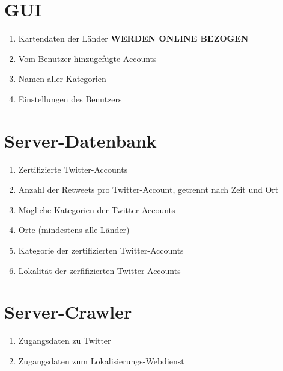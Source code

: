 \section{GUI}
\begin{enumerate}[align=left, label={\textbf{\textbackslash PD10\arabic*0\textbackslash}} ]
	\item Kartendaten der Länder \textbf{WERDEN ONLINE BEZOGEN}
	\item Vom Benutzer hinzugefügte Accounts
	\item Namen aller Kategorien
	\item Einstellungen des Benutzers
\end{enumerate}	
	
\section{Server-Datenbank}
\begin{enumerate}[align=left, label={\textbf{\textbackslash PD20\arabic*0\textbackslash}} ]
	\item Zertifizierte Twitter-Accounts	
	\item Anzahl der Retweets pro Twitter-Account, getrennt nach Zeit und Ort
	\item Mögliche Kategorien der Twitter-Accounts
	\item Orte (mindestens alle Länder)
	\item Kategorie der zertifizierten Twitter-Accounts
	\item Lokalität der zerfifizierten Twitter-Accounts
\end{enumerate}

\section{Server-Crawler}
\begin{enumerate}[align=left, label={\textbf{\textbackslash PD10\arabic*0\textbackslash}} ]
	\item Zugangsdaten zu Twitter
	\item Zugangsdaten zum Lokalisierungs-Webdienst
\end{enumerate}%
